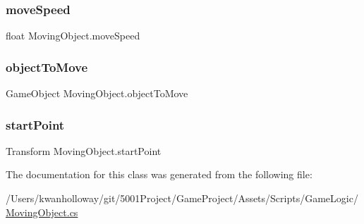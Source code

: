 \subsubsection{\texorpdfstring{move\+Speed}{moveSpeed}}
{\footnotesize\ttfamily float Moving\+Object.\+move\+Speed}

\mbox{\label{class_moving_object_af4b69a184bdd5b7fdf9f7971fd4f0a33}} 
\subsubsection{\texorpdfstring{object\+To\+Move}{objectToMove}}
{\footnotesize\ttfamily Game\+Object Moving\+Object.\+object\+To\+Move}

\mbox{\label{class_moving_object_a0e64d125d08a40852bfb66f95ed1ae18}} 
\subsubsection{\texorpdfstring{start\+Point}{startPoint}}
{\footnotesize\ttfamily Transform Moving\+Object.\+start\+Point}



The documentation for this class was generated from the following file\+:\begin{DoxyCompactItemize}
\item 
/\+Users/kwanholloway/git/5001\+Project/\+Game\+Project/\+Assets/\+Scripts/\+Game\+Logic/\hyperlink{_moving_object_8cs}{Moving\+Object.\+cs}\end{DoxyCompactItemize}
